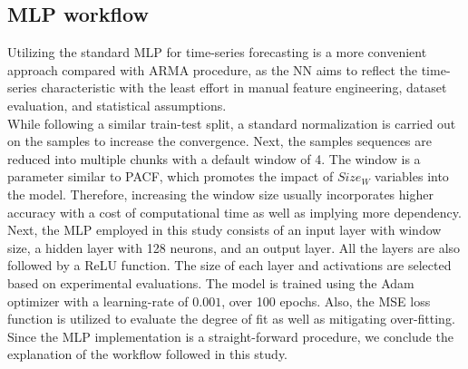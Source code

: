 \documentclass{article}
\begin{document}
\subsection{MLP workflow}
Utilizing the standard MLP for time-series forecasting is a more convenient approach compared with ARMA procedure, as the NN aims to reflect the time-series characteristic with the least effort in manual feature engineering, dataset evaluation, and statistical assumptions.\\
While following a similar train-test split, a standard normalization is carried out on the samples to increase the convergence. Next, the samples sequences are reduced into multiple chunks with a default window of 4. The window is a parameter similar to PACF, which promotes the impact of $Size_{W}$ variables into the model. Therefore, increasing the window size usually incorporates higher accuracy with a cost of computational time as well as implying more dependency.\\
Next, the MLP employed in this study consists of an input layer with window size, a hidden layer with 128 neurons, and an output layer. All the layers are also followed by a ReLU function. The size of each layer and activations are selected based on experimental evaluations. The model is trained using the Adam optimizer with a learning-rate of $0.001$, over 100 epochs. Also, the MSE loss function is utilized to evaluate the degree of fit as well as mitigating over-fitting.\\
Since the MLP implementation is a straight-forward procedure, we conclude the explanation of the workflow followed in this study.
\end{document}
